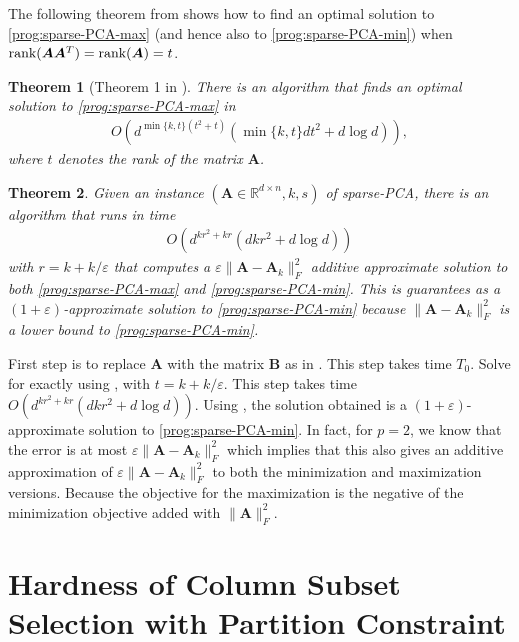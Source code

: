 \documentclass[11pt]{article}
\makeatletter
\theoremstyle{plain}
\newtheorem{theorem}{Theorem}[section]
\theoremstyle{plain}
\theoremstyle{definition}
\theoremstyle{plain}
\theoremstyle{remark}
\newenvironment{proof}[1][\protect\proofname]{\par
	\normalfont\topsep6\p@\@plus6\p@\relax
	\trivlist
	\itemindent\parindent
	\item[\hskip\labelsep\scshape #1]\ignorespaces
}{\endtrivlist\@endpefalse
}
\providecommand{\proofname}{Proof}
\newcommand{\RR}{\mathbb{R}}
\makeatother
\begin{document}
The following theorem from \cite{del2022sparse} shows how to find an optimal solution to \ref{prog:sparse-PCA-max} (and hence also to \ref{prog:sparse-PCA-min}) when $\textnormal{rank}(\bm{A}\bm{A}^T)=\textnormal{rank}(\bm{A})=t$.
\begin{theorem}[Theorem 1 in \cite{del2022sparse}]
\label{thm:sparsepca}
    There is an algorithm that finds an optimal solution to \ref{prog:sparse-PCA-max} in 
    \begin{align}
        O\left(d^{\min\{k,t\}(t^2+t)}\left(\min\{k,t\}dt^2+ d\log d\right)\right),
    \end{align}
    where $t$ denotes the rank of the matrix $\bm{A}$.
\end{theorem}

\begin{theorem}\label{thm:sparse-PCA}
    Given an instance $(\bm{A}\in \RR^{d\times n},k,s)$ of sparse-PCA, there is an algorithm that runs in time 
    \begin{align}
        O\left(d^{kr^2+kr}\left(dkr^2+ d\log d\right)\right)
    \end{align}
with $r=k+k/\varepsilon$ that computes a $\varepsilon \|\bm{A}-\bm{A}_k\|_F^2$ additive approximate solution to both \ref{prog:sparse-PCA-max} and \ref{prog:sparse-PCA-min}. This is guarantees as a $(1+\varepsilon)$-approximate solution to \ref{prog:sparse-PCA-min} because $\|\bm{A}-\bm{A}_k\|_F^2$ is a lower bound to \ref{prog:sparse-PCA-min}. 
\end{theorem}
\begin{proof}
First step is to replace $\bm{A}$ with the matrix $\bm{B}$ as in . This step takes time $T_0$. Solve for  exactly using , with $t=k+k/\varepsilon$. This step takes time   $ O\left(d^{kr^2+kr}\left(dkr^2+ d\log d\right)\right)$. 
 Using , the solution obtained is a $(1+\varepsilon)$-approximate solution to \ref{prog:sparse-PCA-min}. In fact, for $p=2$, we know that the error is at most $\varepsilon \|\bm{A}-\bm{A}_k\|_F^2$ which implies that this also gives an additive approximation of $\varepsilon \|\bm{A}-\bm{A}_k\|_F^2$ to both the minimization and maximization versions. Because the objective for the maximization is the negative of the minimization objective added with $\|\bm{A}\|_F^2$.
\end{proof}


\section{Hardness of Column Subset Selection with Partition Constraint}\label{sec:css-hardness}
\end{document}
